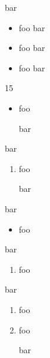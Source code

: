 bar

\begin{itemize}
\item foo
bar
\item foo
bar
\item foo
bar
\end{itemize}

15

\begin{itemize}
\item foo

bar
\end{itemize}

bar

\begin{enumerate}
\item foo

bar
\end{enumerate}

bar

\begin{itemize}
\item foo
\end{itemize}

bar

\begin{enumerate}
\item foo
\end{enumerate}

bar

\begin{enumerate}
\item foo
\item foo

bar
\end{enumerate}


